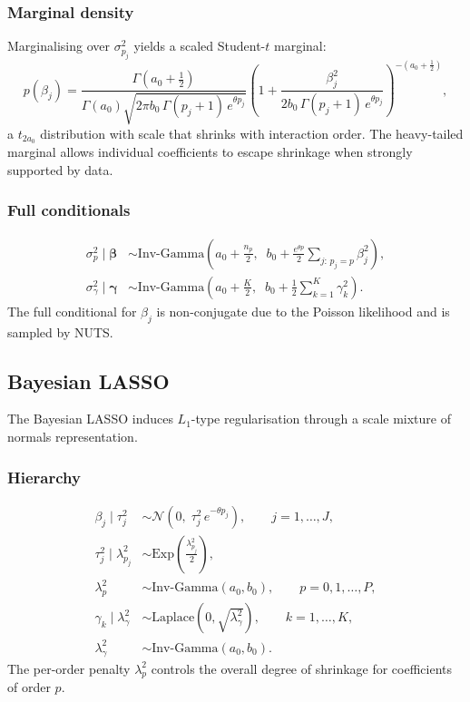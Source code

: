 \documentclass[12pt]{article}
\begin{document}
\subsubsection{Marginal density}
Marginalising over $\sigma^2_{p_j}$ yields a scaled Student-$t$ marginal:
\begin{equation}
p(\beta_j) = \frac{\Gamma(a_0 + \tfrac{1}{2})}{\Gamma(a_0)\sqrt{2\pi b_0\,\Gamma(p_j+1)\,e^{\theta p_j}}} \left(1 + \frac{\beta_j^2}{2b_0\,\Gamma(p_j+1)\,e^{\theta p_j}}\right)^{-(a_0+\frac{1}{2})},
\end{equation}
a $t_{2a_0}$ distribution with scale that shrinks with interaction order. The
heavy-tailed marginal allows individual coefficients to escape shrinkage when
strongly supported by data.

\subsubsection{Full conditionals}
\begin{align}
\sigma^2_p \mid \boldsymbol{\beta} &\sim \mathrm{Inv\text{-}Gamma}\!\left(a_0 + \frac{n_p}{2},\;\; b_0 + \frac{e^{\theta p}}{2} \sum_{j:\,p_j=p} \beta_j^2\right),\\
\sigma^2_\gamma \mid \boldsymbol{\gamma} &\sim \mathrm{Inv\text{-}Gamma}\!\left(a_0 + \frac{K}{2},\;\; b_0 + \frac{1}{2}\sum_{k=1}^K \gamma_k^2\right).
\end{align}
The full conditional for $\beta_j$ is non-conjugate due to the Poisson
likelihood and is sampled by NUTS.

\subsection{Bayesian LASSO}

The Bayesian LASSO \citep{ParkCasella2008} induces $L_1$-type regularisation
through a scale mixture of normals representation.

\subsubsection{Hierarchy}
\begin{align}
\beta_j \mid \tau^2_j &\sim \mathcal{N}\!\left(0,\; \tau^2_j\, e^{-\theta p_j}\right), \qquad j = 1, \dots, J,\\
\tau^2_j \mid \lambda^2_{p_j} &\sim \mathrm{Exp}\!\left(\frac{\lambda^2_{p_j}}{2}\right),\\
\lambda^2_p &\sim \mathrm{Inv\text{-}Gamma}(a_0, b_0), \qquad p = 0, 1, \dots, P,\\
\gamma_k \mid \lambda^2_\gamma &\sim \mathrm{Laplace}(0, \sqrt{\lambda^2_\gamma}),\qquad k = 1, \dots, K,\\
\lambda^2_\gamma &\sim \mathrm{Inv\text{-}Gamma}(a_0, b_0).
\end{align}
The per-order penalty $\lambda^2_p$ controls the overall degree of shrinkage
for coefficients of order $p$.
\end{document}
